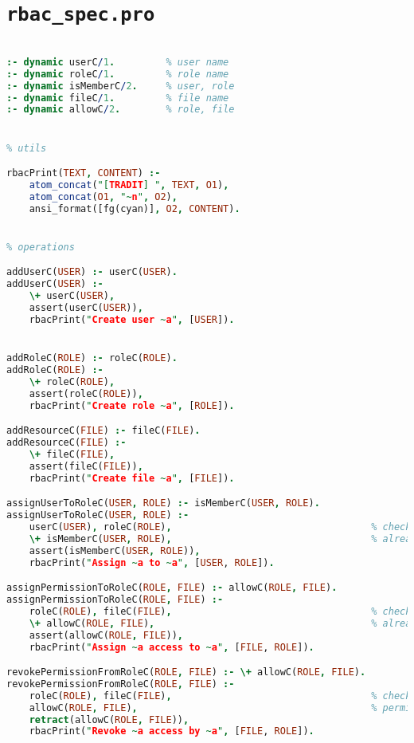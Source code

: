\section{\texttt{rbac_spec.pro}}
\label{app:prologcode.rbac}

\setcode
\begin{lstlisting}[language=Prolog]
% dynamic predicates

:- dynamic userC/1.         % user name
:- dynamic roleC/1.         % role name
:- dynamic isMemberC/2.     % user, role
:- dynamic fileC/1.         % file name
:- dynamic allowC/2.        % role, file


% utils 

rbacPrint(TEXT, CONTENT) :-
    atom_concat("[TRADIT] ", TEXT, O1),
    atom_concat(O1, "~n", O2),
    ansi_format([fg(cyan)], O2, CONTENT).


% operations

addUserC(USER) :- userC(USER).
addUserC(USER) :- 
    \+ userC(USER),
    assert(userC(USER)),
    rbacPrint("Create user ~a", [USER]).


addRoleC(ROLE) :- roleC(ROLE).
addRoleC(ROLE) :-
    \+ roleC(ROLE),
    assert(roleC(ROLE)),
    rbacPrint("Create role ~a", [ROLE]).

addResourceC(FILE) :- fileC(FILE).
addResourceC(FILE) :-
    \+ fileC(FILE),
    assert(fileC(FILE)),
    rbacPrint("Create file ~a", [FILE]).

assignUserToRoleC(USER, ROLE) :- isMemberC(USER, ROLE).
assignUserToRoleC(USER, ROLE) :-
    userC(USER), roleC(ROLE),                                   % checks
    \+ isMemberC(USER, ROLE),                                   % already member
    assert(isMemberC(USER, ROLE)),
    rbacPrint("Assign ~a to ~a", [USER, ROLE]).

assignPermissionToRoleC(ROLE, FILE) :- allowC(ROLE, FILE).
assignPermissionToRoleC(ROLE, FILE) :-
    roleC(ROLE), fileC(FILE),                                   % checks
    \+ allowC(ROLE, FILE),                                      % already has permission
    assert(allowC(ROLE, FILE)),
    rbacPrint("Assign ~a access to ~a", [FILE, ROLE]).

revokePermissionFromRoleC(ROLE, FILE) :- \+ allowC(ROLE, FILE).
revokePermissionFromRoleC(ROLE, FILE) :-
    roleC(ROLE), fileC(FILE),                                   % checks
    allowC(ROLE, FILE),                                         % permission is assigned
    retract(allowC(ROLE, FILE)),
    rbacPrint("Revoke ~a access by ~a", [FILE, ROLE]).


\end{lstlisting}
